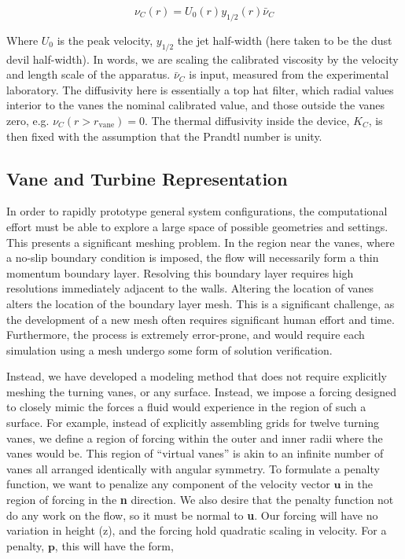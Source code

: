 \begin{equation}
 \nu_C(r) = U_0(r) y_{1/2}(r) \bar \nu_C
\end{equation}

Where $U_0$ is the peak velocity, $y_{1/2}$ the jet half-width (here
taken to be the dust devil half-width). In words, we are scaling the
calibrated viscosity by the velocity and length scale of the
apparatus. $\bar \nu_C $ is input, measured from the experimental
laboratory.  The diffusivity here is essentially a top hat filter, which
radial values interior to the vanes the nominal calibrated value, and
those outside the vanes zero, e.g. $\nu_C(r>r_{\text{vane}})=0$. The
thermal diffusivity inside the device, $K_C$, is then fixed with the
assumption that the Prandtl number is unity.  

\subsection{Vane and Turbine Representation}

In order to rapidly prototype general system configurations, the
computational effort must be able to explore a large space of possible
geometries and settings. This presents a significant meshing
problem. In the region near the vanes, where a no-slip boundary
condition is imposed, the flow will necessarily form a thin momentum
boundary layer. Resolving this boundary layer requires high resolutions
immediately adjacent to the walls. Altering the location of vanes
alters the location of the boundary layer mesh. This is a significant
challenge, as the development of a new mesh often requires significant
human effort and time. Furthermore, the process is extremely
error-prone, and would require each simulation using a mesh undergo
some form of solution verification. 

Instead, we have developed a modeling method that does not require
explicitly meshing the turning vanes, or any surface. Instead, we impose
a forcing designed to closely mimic the forces a fluid would experience
in the region of such a surface. For example, instead of explicitly
assembling grids for twelve turning vanes, we define a region of forcing
within the 
outer and inner radii where the vanes would be. This region of ``virtual
vanes'' is akin to an infinite number of vanes all arranged identically
with angular symmetry. To formulate a penalty function, we want to
penalize any component of the velocity vector $\textbf{u}$ in the region
of forcing in the \textbf{n} direction. We also desire that the penalty
function not do any work on the flow, so it must be normal to
\textbf{u}. Our forcing will have no variation in height (z), and the
forcing hold quadratic scaling in velocity. For a penalty,
$\textbf{p}$, this will have the form,   

